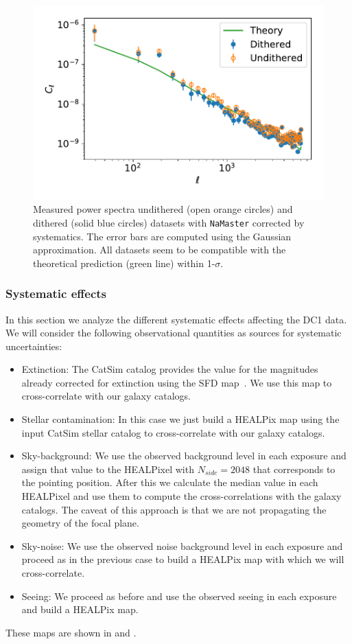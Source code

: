\documentclass[\docopts]{\docclass}
\begin{document}
\begin{figure}
\centering
\includegraphics[width=0.9\columnwidth]{Cl_25p3_errors}
\caption{Measured power spectra undithered (open orange circles) and dithered (solid blue circles) datasets with \texttt{NaMaster} corrected by systematics. The error bars are computed using the Gaussian approximation. All datasets seem to be compatible with the theoretical prediction (green line) within 1-$\sigma$.}
\label{fig:power_spectra}
\end{figure}
\subsubsection{Systematic effects}
In this section we analyze the different systematic effects affecting the DC1 data. We will consider the following observational quantities as sources for systematic uncertainties:
\begin{itemize}
\item Extinction: The CatSim catalog provides the value for the magnitudes already corrected for extinction using the SFD map~\citep{1998ApJ...500..525S}. We use this map to cross-correlate with our galaxy catalogs.
\item Stellar contamination: In this case we just build a HEALPix map using the input CatSim stellar catalog to cross-correlate with our galaxy catalogs.
\item Sky-background: We use the observed background level in each exposure and assign that value to the HEALPixel with $N_{side}=2048$ that corresponds to the pointing position. After this we calculate the median value in each HEALPixel and use them to compute the cross-correlations with the galaxy catalogs. The caveat of this approach is that we are not propagating the geometry of the focal plane.
\item Sky-noise: We use the observed noise background level in each exposure and proceed as in the previous case to build a HEALPix map with which we will cross-correlate.
\item Seeing: We proceed as before and use the observed seeing in each exposure and build a HEALPix map.
\end{itemize}
These maps are shown in  and . 
\end{document}
